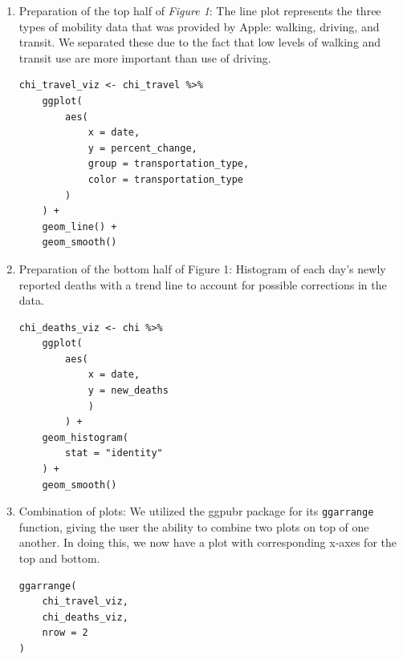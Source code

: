 \documentclass[11pt, english]{article}
\begin{document}
\begin{enumerate}
    \item Preparation of the top half of \textit{Figure 1}: The line plot represents the three types of mobility data that was provided by Apple: walking, driving, and transit. We separated these due to the fact that low levels of walking and transit use are more important than use of driving.
\begin{verbatim}
chi_travel_viz <- chi_travel %>% 
    ggplot(
        aes(
            x = date,
            y = percent_change,
            group = transportation_type,
            color = transportation_type
        )
    ) + 
    geom_line() +
    geom_smooth()
\end{verbatim}
\newpage
    \item Preparation of the bottom half of Figure 1: Histogram of each day’s newly reported deaths with a trend line to account for possible corrections in the data.
\begin{verbatim}
chi_deaths_viz <- chi %>% 
    ggplot(
        aes(
            x = date, 
            y = new_deaths
            )
        ) +
    geom_histogram(
        stat = "identity"
    ) + 
    geom_smooth()
\end{verbatim}

    \item Combination of plots: We utilized the ggpubr package for its \texttt{ggarrange} function, giving the user the ability to combine two plots on top of one another. In doing this, we now have a plot with corresponding x-axes for the top and bottom.
\begin{verbatim}
ggarrange(
    chi_travel_viz, 
    chi_deaths_viz, 
    nrow = 2
)
\end{verbatim}
\end{enumerate}
\newpage
\end{document}
